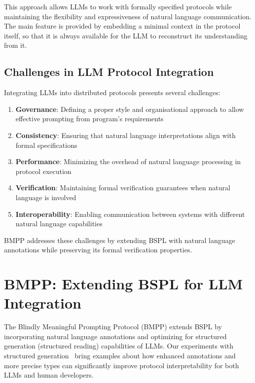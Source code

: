 \documentclass[11pt,a4paper]{article}
\begin{document}
	This approach allows LLMs to work with formally specified protocols while maintaining the flexibility and expressiveness of natural language communication. The main feature is provided by embedding a minimal context in the protocol itself, so that it is always available for the LLM to reconstruct its understanding from it.
	
	\subsection{Challenges in LLM Protocol Integration}
	\label{subsec:challenges}
	
	Integrating LLMs into distributed protocols presents several challenges:
	
	\begin{enumerate}
		\item \textbf{Governance}: Defining a proper style and organisational approach to allow effective prompting from program's requirements
		\item \textbf{Consistency}: Ensuring that natural language interpretations align with formal specifications
		\item \textbf{Performance}: Minimizing the overhead of natural language processing in protocol execution
		\item \textbf{Verification}: Maintaining formal verification guarantees when natural language is involved
		\item \textbf{Interoperability}: Enabling communication between systems with different natural language capabilities
	\end{enumerate}
	
	BMPP addresses these challenges by extending BSPL with natural language annotations while preserving its formal verification properties.
	
	\section{BMPP: Extending BSPL for LLM Integration}
	\label{sec:bmpp-design}
	
	The Blindly Meaningful Prompting Protocol (BMPP) extends BSPL by incorporating natural language annotations and optimizing for structured generation (structured reading) capabilities of LLMs. Our experiments with structured generation~\cite{w3c-agents-features} bring examples about how enhanced annotations and more precise types can significantly improve protocol interpretability for both LLMs and human developers.
	
\end{document}
